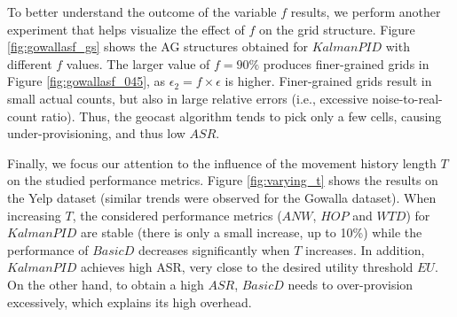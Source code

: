 \documentclass{USC-Thesis}
\numberwithin{equation}{chapter}
\begin{document}
To better understand the outcome of the variable $f$ results, we perform another experiment that helps visualize the effect of $f$ on the grid structure.
Figure \ref{fig:gowallasf_gs} shows the AG structures obtained for $\mathit{KalmanPID}$ with different $f$ values. The larger value of $f = 90\%$ produces finer-grained grids in Figure \ref{fig:gowallasf_045}, as $\epsilon_2=f \times \epsilon$ is higher. Finer-grained grids result in small actual counts, but also in large relative errors (i.e., excessive noise-to-real-count ratio). Thus, the geocast algorithm tends to pick only a few cells, causing under-provisioning, and thus low $\mathit{ASR}$. 

\begin{comment}
\begin{figure*}[tbh]
	\begin{minipage}[b]{0.195\linewidth}
	\centering
		\texttt{[image: exps/ye\_li\_anw\_vk]}
		\subcaption{$\mathit{ANW}$, Ye.-Linear}
		\label{fig:ye_li_anw_vk}
	\end{minipage}
	\begin{minipage}[b]{0.195\linewidth}
	\centering
		\texttt{[image: exps/ye\_li\_hop\_vk]}
		\subcaption{$\mathit{HOP}$, Ye.-Linear}
		\label{fig:ye_li_hop_vk}
	\end{minipage}
	\begin{minipage}[b]{0.195\linewidth}
	\centering
		\texttt{[image: exps/ye\_li\_wtd\_vk]}
		\subcaption{$\mathit{WTD}$, Ye.-Linear}
		\label{fig:ye_li_wtd_vk}
	\end{minipage}	
	\begin{minipage}[b]{0.195\linewidth}
		\centering
		\texttt{[image: exps/ye\_li\_asr\_vk]}
		\subcaption{$\mathit{ASR}$, Ye.-Linear}
		\label{fig:ye_li_asr_vk}
	\end{minipage}
		\begin{minipage}[b]{0.195\linewidth}
		\centering
		\texttt{[image: exps/ye\_li\_cell\_vk]}
		\subcaption{$\mathit{CELL}$, Ye.-Linear}
		\label{fig:ye_li_cell_vk}
	\end{minipage}
	\caption{Varying number of workers required $K$ to complete a task.}
\label{fig:varying_k2}
\end{figure*}
\end{comment}

Finally, we focus our attention to the influence of the movement history length $T$ on the studied performance metrics.
Figure \ref{fig:varying_t} shows the results on the Yelp dataset (similar trends were observed for the Gowalla dataset). When increasing $T$, the considered performance metrics ($\mathit{ANW}$, $\mathit{HOP}$ and $\mathit{WTD}$) for $\mathit{KalmanPID}$ are stable (there is only a small increase, up to 10\%) while the performance of $\mathit{BasicD}$ decreases significantly when $T$ increases. 
In addition, $\mathit{KalmanPID}$ achieves high ASR, very close to the desired utility threshold $\mathit{EU}$. On the other hand, to obtain a high $\mathit{ASR}$, $\mathit{BasicD}$ needs to over-provision excessively, which explains its high overhead.
\end{document}
